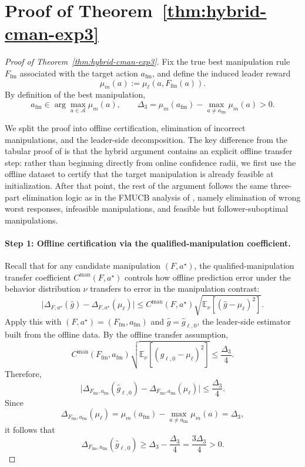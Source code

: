 \documentclass{article}
\newcommand{\E}{\mathbb{E}}           %
\begin{document}
\section{Proof of Theorem~\ref{thm:hybrid-cman-exp3}}
\label{app:proof-main}

\begin{proof}[Proof of Theorem~\ref{thm:hybrid-cman-exp3}]
Fix the true best manipulation rule $F_{\mathrm{fm}}$ associated with
the target action $a_{\mathrm{fm}}$, and define the induced leader
reward
\[
\mu_m(a):=\mu_\ell(a,F_{\mathrm{fm}}(a)).
\]
By definition of the best manipulation,
\[
a_{\mathrm{fm}}\in\arg\max_{a\in\mathcal A}\mu_m(a),
\qquad
\Delta_3
=
\mu_m(a_{\mathrm{fm}})
-
\max_{a\neq a_{\mathrm{fm}}}\mu_m(a)
>0.
\]

We split the proof into offline certification, elimination of
incorrect manipulations, and the leader-side decomposition. The key
difference from the tabular proof of \cite{yu2024decentralized} is
that the hybrid argument contains an explicit offline transfer step:
rather than beginning directly from online confidence radii, we first
use the offline dataset to certify that the target manipulation is
already feasible at initialization. After that point, the rest of the
argument follows the same three-part elimination logic as in the FMUCB
analysis of \cite{yu2024decentralized}, namely elimination of wrong
worst responses, infeasible manipulations, and feasible but
follower-suboptimal manipulations.

\paragraph{Step 1: Offline certification via the qualified-manipulation coefficient.}
Recall that for any candidate manipulation $(F,a^\star)$, the
qualified-manipulation transfer coefficient
$C^{\mathrm{man}}(F,a^\star)$ controls how offline prediction error
under the behavior distribution $\nu$ transfers to error in the
manipulation contrast:
\[
\bigl|
\Delta_{F,a^\star}(\widehat g)-\Delta_{F,a^\star}(\mu_\ell)
\bigr|
\le
C^{\mathrm{man}}(F,a^\star)
\sqrt{\E_\nu\!\left[(\widehat g-\mu_\ell)^2\right]}.
\]
Apply this with $(F,a^\star)=(F_{\mathrm{fm}},a_{\mathrm{fm}})$ and
$\widehat g=\widehat g_{\ell,0}$, the leader-side estimator built from
the offline data. By the offline transfer assumption,
\[
C^{\mathrm{man}}(F_{\mathrm{fm}},a_{\mathrm{fm}})
\sqrt{\E_\nu\!\left[(\widehat g_{\ell,0}-\mu_\ell)^2\right]}
\le
\frac{\Delta_3}{4}.
\]
Therefore,
\[
\bigl|
\Delta_{F_{\mathrm{fm}},a_{\mathrm{fm}}}(\widehat g_{\ell,0})
-
\Delta_{F_{\mathrm{fm}},a_{\mathrm{fm}}}(\mu_\ell)
\bigr|
\le
\frac{\Delta_3}{4}.
\]
Since
\[
\Delta_{F_{\mathrm{fm}},a_{\mathrm{fm}}}(\mu_\ell)
=
\mu_m(a_{\mathrm{fm}})
-
\max_{a\neq a_{\mathrm{fm}}}\mu_m(a)
=
\Delta_3,
\]
it follows that
\[
\Delta_{F_{\mathrm{fm}},a_{\mathrm{fm}}}(\widehat g_{\ell,0})
\ge
\Delta_3-\frac{\Delta_3}{4}
=
\frac{3\Delta_3}{4}
>0.
\]


\end{proof}
\end{document}
